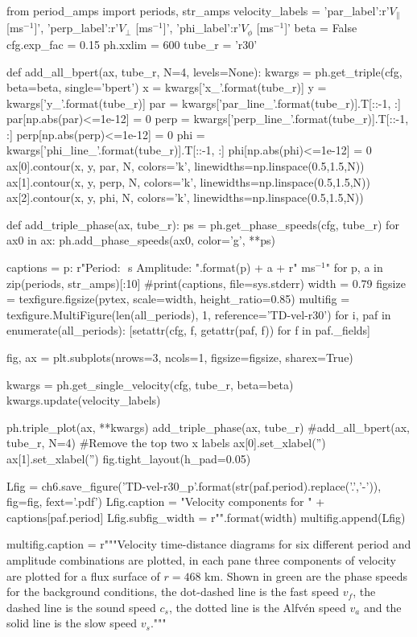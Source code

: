 \begin{pycode}[chapter6]

from period_amps import periods, str_amps
velocity_labels = {'par_label':r'$ V_\parallel$ [ms$^{-1}$]', 
                   'perp_label':r'$ V_\perp$ [ms$^{-1}$]',
                   'phi_label':r'$ V_\phi$ [ms$^{-1}$]'}
beta = False
cfg.exp_fac = 0.15
ph.xxlim = 600
tube_r = 'r30'

def add_all_bpert(ax, tube_r, N=4, levels=None):
    kwargs = ph.get_triple(cfg, beta=beta, single='bpert')
    x = kwargs['x_{}'.format(tube_r)]
    y = kwargs['y_{}'.format(tube_r)]
    par = kwargs['par_line_{}'.format(tube_r)].T[::-1, :]
    par[np.abs(par)<=1e-12] = 0
    perp = kwargs['perp_line_{}'.format(tube_r)].T[::-1, :]
    perp[np.abs(perp)<=1e-12] = 0
    phi = kwargs['phi_line_{}'.format(tube_r)].T[::-1, :]
    phi[np.abs(phi)<=1e-12] = 0
    ax[0].contour(x, y, par, N, colors='k', linewidths=np.linspace(0.5,1.5,N))
    ax[1].contour(x, y, perp, N, colors='k', linewidths=np.linspace(0.5,1.5,N))
    ax[2].contour(x, y, phi, N, colors='k', linewidths=np.linspace(0.5,1.5,N))	                   

def add_triple_phase(ax, tube_r):
    ps = ph.get_phase_speeds(cfg, tube_r)
    for ax0 in ax:
        ph.add_phase_speeds(ax0, color='g', **ps)

captions = {p: r"Period: ${}$ s Amplitude: ".format(p) + a + r" ms$^{{-1}}$" for p, a in zip(periods, str_amps)[:10]}
#print(captions, file=sys.stderr)
width = 0.79
figsize = texfigure.figsize(pytex, scale=width, height_ratio=0.85)
multifig = texfigure.MultiFigure(len(all_periods), 1, reference='TD-vel-r30')
for i, paf in enumerate(all_periods):
    [setattr(cfg, f, getattr(paf, f)) for f in paf._fields]

    fig, ax = plt.subplots(nrows=3, ncols=1, figsize=figsize, sharex=True)
    
    kwargs = ph.get_single_velocity(cfg, tube_r, beta=beta)
    kwargs.update(velocity_labels)
    
    ph.triple_plot(ax, **kwargs)
    add_triple_phase(ax, tube_r)
    #add_all_bpert(ax, tube_r, N=4)
    #Remove the top two x labels
    ax[0].set_xlabel('')
    ax[1].set_xlabel('')
    fig.tight_layout(h_pad=0.05)
    
    Lfig = ch6.save_figure('TD-vel-r30_p{}'.format(str(paf.period).replace('.','-')), fig=fig, fext='.pdf')
    Lfig.caption = "Velocity components for " + captions[paf.period]
    Lfig.subfig_width = r"{}\columnwidth".format(width)
    multifig.append(Lfig)

multifig.caption = r"""Velocity time-distance diagrams for six different period and amplitude combinations are plotted, in each pane three components of velocity are plotted for a flux surface of $r=468$ km. Shown in green are the phase speeds for the background conditions, the dot-dashed line is the fast speed $v_f$, the dashed line is the sound speed $c_s$, the dotted line is the Alfv\'en speed $v_a$ and the solid line is the slow speed $v_s$."""
\end{pycode}

